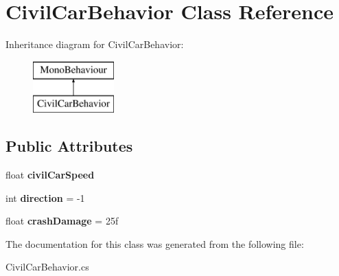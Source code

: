 \hypertarget{class_civil_car_behavior}{}\section{Civil\+Car\+Behavior Class Reference}
\label{class_civil_car_behavior}
Inheritance diagram for Civil\+Car\+Behavior\+:\begin{figure}[H]
\begin{center}
\leavevmode
\includegraphics[height=2.000000cm]{class_civil_car_behavior}
\end{center}
\end{figure}
\subsection*{Public Attributes}
\begin{DoxyCompactItemize}
\item 
\mbox{\label{class_civil_car_behavior_aebb222030998599113eb783dfc903fc4}} 
float {\bfseries civil\+Car\+Speed}
\item 
\mbox{\label{class_civil_car_behavior_a74149c796566b4900c6ecc677b02608e}} 
int {\bfseries direction} = -\/1
\item 
\mbox{\label{class_civil_car_behavior_abff5edca11197e0f032e7b2ebd74aba2}} 
float {\bfseries crash\+Damage} = 25f
\end{DoxyCompactItemize}


The documentation for this class was generated from the following file\+:\begin{DoxyCompactItemize}
\item 
Civil\+Car\+Behavior.\+cs\end{DoxyCompactItemize}
